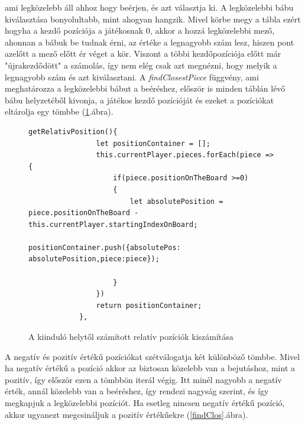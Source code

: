 \documentclass[a4paper,twoside]{article}
\begin{document}
ami legközelebb áll ahhoz hogy beérjen, és azt választja ki. A legközelebbi bábu kiválasztása bonyolultabb, mint ahogyan hangzik. Mivel körbe megy a tábla ezért hogyha a kezdő pozíciója a játékosnak 0, akkor a hozzá legközelebbi mező, ahonnan a bábuk be tudnak érni, az értéke a legnagyobb szám lesz, hiszen pont azelőtt a mező előtt ér véget a kör. Viszont a többi kezdőpozíciója előtt már "újrakezdődött" a számolás, így nem elég csak azt megnézni, hogy melyik a legnagyobb szám és azt kiválasztani. A \textit{findClosestPiece} függvény, ami meghatározza a legközelebbi bábut a beéréshez, először is minden táblán lévő bábu helyzetéből kivonja, a játékos kezdő pozícióját és ezeket a pozíciókat eltárolja egy tömbbe (\ref{absPos}.ábra).
\begin{figure}
	\caption{A kiinduló helytől számított relatív pozíciók kiszámítása}
	\begin{minipage}{\textwidth}
		\begin{lstlisting}[style=javascriptStyle]
			getRelativPosition(){
				let positionContainer = [];
				this.currentPlayer.pieces.forEach(piece => {
					if(piece.positionOnTheBoard >=0)
					{
						let absolutePosition = piece.positionOnTheBoard - this.currentPlayer.startingIndexOnBoard;
						positionContainer.push({absolutePos: absolutePosition,piece:piece});
						
					}
				})
				return positionContainer;
			},
		\end{lstlisting}
	\end{minipage}
	
	\label{absPos}
\end{figure}
\FloatBarrier
 A negatív és pozitív értékű pozíciókat szétválogatja két különböző tömbbe. Mivel ha negatív értékű a pozíció akkor az biztosan közelebb van a bejutáshoz, mint a pozitív, így először ezen a tömbbön iterál végig. Itt minél nagyobb a negatív érték, annál közelebb van a beéréshez, így rendezi nagyság szerint, és így megkapjuk a legközelebbi pozíciót. Ha esetleg nincsen negatív értékű pozíció, akkor ugyanezt megcsináljuk a pozitív értékűekre (\ref{findClos}.ábra). 
\end{document}
